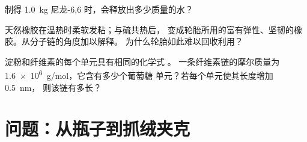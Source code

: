 \begin{exercise}[$\star\star\star$]\label{exo:g12:polymers:13}
制得 \qty{1.0}{kg} 尼龙-6,6 时，会释放出多少质量的水？
\end{exercise}

\begin{exercise}[$\star\star\star$]\label{exo:g12:polymers:14}
天然橡胶在温热时柔软发粘；与硫共热后，
变成轮胎所用的富有弹性、坚韧的橡胶。从分子链的角度加以解释。
为什么轮胎如此难以回收利用？
\end{exercise}

\begin{exercise}[$\star\star\star$]\label{exo:g12:polymers:15}
淀粉和纤维素的每个单元具有相同的化学式 。
一条纤维素链的摩尔质量为 \qty{1.6e6}{g/mol}，它含有多少个葡萄糖
单元？若每个单元使其长度增加 \qty{0.5}{nm}，
则该链有多长？
\end{exercise}

\section{问题：从瓶子到抓绒夹克}

